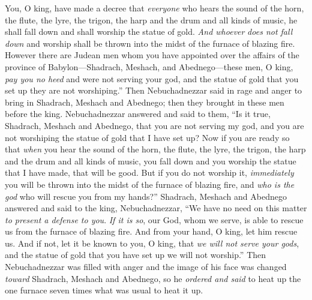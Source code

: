 \begin{biblechapter}
\verse You, O king, have made a decree that \textit{everyone} who hears the sound of the horn, the flute, the lyre, the trigon, the harp and the drum and all kinds of music, he shall fall down and shall worship the statue of gold.
\verse \textit{And whoever} \textit{does not fall down} and worship shall be thrown into the midst of the furnace of blazing fire.
\verse However there are Judean men whom you have appointed over the affairs of the province of Babylon—Shadrach, Meshach, and Abednego—these men, O king, \textit{pay you no heed} and were not serving your god, and the statue of gold that you set up they are not worshiping.”
\verse Then Nebuchadnezzar said in rage and anger to bring in Shadrach, Meshach and Abednego; then they brought in these men before the king.
\verse Nebuchadnezzar answered and said to them, “Is it true, Shadrach, Meshach and Abednego, that you are not serving my god, and you are not worshiping the statue of gold that I have set up?
\verse Now if you are ready so that \textit{when} you hear the sound of the horn, the flute, the lyre, the trigon, the harp and the drum and all kinds of music, you fall down and you worship the statue that I have made, that will be good. But if you do not worship it, \textit{immediately} you will be thrown into the midst of the furnace of blazing fire, and \textit{who is the god} who will rescue you from my hands?”
\verse Shadrach, Meshach and Abednego answered and said to the king, Nebuchadnezzar, “We have no need on this matter \textit{to present a defense to you}.
\verse \textit{If it is so}, our God, whom we serve, is able to rescue us from the furnace of blazing fire. And from your hand, O king, let him rescue us.
\verse And if not, let it be known to you, O king, that \textit{we will not serve your gods}, and the statue of gold that you have set up we will not worship.”
 Then Nebuchadnezzar was filled with anger and the image of his face was changed \textit{toward} Shadrach, Meshach and Abednego, so he \textit{ordered and said} to heat up the one furnace seven times what was usual to heat it up.

\end{biblechapter}
